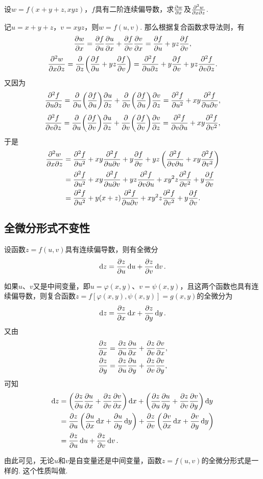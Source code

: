 \begin{example}
设\(w = f(x+y+z,xyz)\)，\(f\)具有二阶连续偏导数，求\(\pdv{w}{x}\)及\(\pdv[2]{w}{x}{z}\).
\begin{solution}
记\(u = x+y+z\)，\(v = xyz\)，则\(w = f(u,v)\).
那么根据复合函数求导法则，有\[
\pdv{w}{x} = \pdv{f}{u} \pdv{u}{x} + \pdv{f}{v} \pdv{v}{x}
= \pdv{f}{u} + yz \pdv{f}{v},
\]\[
\pdv[2]{w}{x}{z} = \pdv{z}(\pdv{f}{u} + yz \pdv{f}{v})
= \pdv[2]{f}{u}{z} + y\pdv{f}{v} + yz \pdv[2]{f}{v}{z}.
\]又因为\[
\pdv[2]{f}{u}{z}
= \pdv{u}(\pdv{f}{u}) \pdv{u}{z} + \pdv{v}(\pdv{f}{u}) \pdv{v}{z}
= \pdv[2]{f}{u} + xy \pdv[2]{f}{u}{v},
\]\[
\pdv[2]{f}{v}{z}
= \pdv{u}(\pdv{f}{v}) \pdv{u}{z} + \pdv{v}(\pdv{f}{v}) \pdv{v}{z}
= \pdv[2]{f}{v}{u} + xy \pdv[2]{f}{v},
\]于是\begin{align*}
\pdv[2]{w}{x}{z}
&= \pdv[2]{f}{u} + xy \pdv[2]{f}{u}{v}
 + y\pdv{f}{v} + yz \left( \pdv[2]{f}{v}{u} + xy \pdv[2]{f}{v} \right) \\
&= \pdv[2]{f}{u}
 + xy \pdv[2]{f}{u}{v} + yz \pdv[2]{f}{v}{u}
 + x y^2 z \pdv[2]{f}{v}
 + y \pdv{f}{v} \\
&= \pdv[2]{f}{u}
 + y(x+z) \pdv[2]{f}{u}{v}
 + x y^2 z \pdv[2]{f}{v}
 + y \pdv{f}{v}.
\end{align*}
\end{solution}
\end{example}

\subsection{全微分形式不变性}
\begin{theorem}[全微分形式不变性]
设函数\(z=f(u,v)\)具有连续偏导数，则有全微分\[
\dd{z}=\pdv{z}{u}\dd{u}+\pdv{z}{v}\dd{v}.
\]

如果\(u\)、\(v\)又是中间变量，即\(u=\varphi(x,y)\)、\(v=\psi(x,y)\)，且这两个函数也具有连续偏导数，则复合函数\(z=f[\varphi(x,y),\psi(x,y)]=g(x,y)\)的全微分为\[
\dd{z}=\pdv{z}{x}\dd{x}+\pdv{z}{y}\dd{y}.
\]又由\begin{gather*}
\pdv{z}{x} = \pdv{z}{u}\pdv{u}{x} + \pdv{z}{v}\pdv{v}{x}, \\
\pdv{z}{y} = \pdv{z}{u}\pdv{u}{y} + \pdv{z}{v}\pdv{v}{y},
\end{gather*}可知\begin{align*}
\dd{z}
&=\left(\pdv{z}{u}\pdv{u}{x} + \pdv{z}{v}\pdv{v}{x}\right)\dd{x}
+\left(\pdv{z}{u}\pdv{u}{y} + \pdv{z}{v}\pdv{v}{y}\right)\dd{y} \\
&=\pdv{z}{u}\left(\pdv{u}{x}\dd{x}+\pdv{u}{y}\dd{y}\right)
+\pdv{z}{v}\left(\pdv{v}{x}\dd{x}+\pdv{v}{y}\dd{y}\right) \\
&=\pdv{z}{u}\dd{u}+\pdv{z}{v}\dd{v}.
\end{align*}
\end{theorem}
由此可见，无论\(u\)和\(v\)是自变量还是中间变量，函数\(z=f(u,v)\)的全微分形式是一样的.
这个性质叫做.

